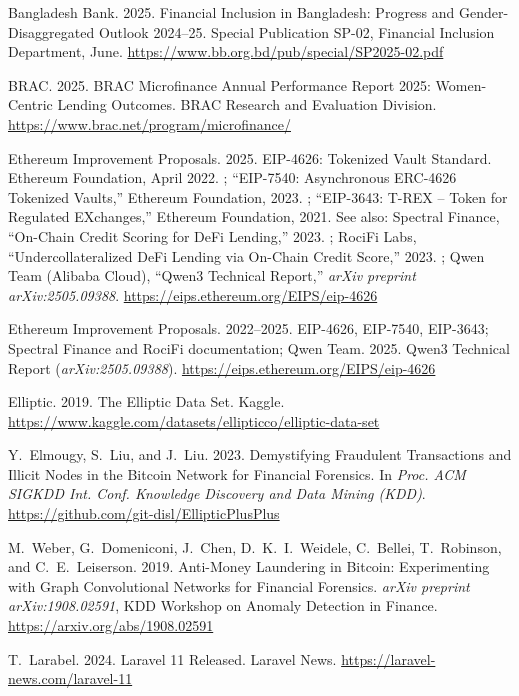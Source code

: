 \documentclass[12pt, a4paper]{report}
\begin{document}
{\begin{enumerate}[label={[\arabic*]}]
\item Bangladesh Bank. 2025. Financial Inclusion in Bangladesh: Progress and Gender-Disaggregated Outlook 2024--25. Special Publication SP-02, Financial Inclusion Department, June. \url{https://www.bb.org.bd/pub/special/SP2025-02.pdf}

\item BRAC. 2025. BRAC Microfinance Annual Performance Report 2025: Women-Centric Lending Outcomes. BRAC Research and Evaluation Division. \url{https://www.brac.net/program/microfinance/}

\item Ethereum Improvement Proposals. 2025. EIP-4626: Tokenized Vault Standard. Ethereum Foundation, April 2022. ; ``EIP-7540: Asynchronous ERC-4626 Tokenized Vaults,'' Ethereum Foundation, 2023. ; ``EIP-3643: T-REX -- Token for Regulated EXchanges,'' Ethereum Foundation, 2021.  See also: Spectral Finance, ``On-Chain Credit Scoring for DeFi Lending,'' 2023. ; RociFi Labs, ``Undercollateralized DeFi Lending via On-Chain Credit Score,'' 2023. ; Qwen Team (Alibaba Cloud), ``Qwen3 Technical Report,'' \emph{arXiv preprint arXiv:2505.09388}. \url{https://eips.ethereum.org/EIPS/eip-4626}

\item Ethereum Improvement Proposals. 2022--2025. EIP-4626, EIP-7540, EIP-3643; Spectral Finance and RociFi documentation; Qwen Team. 2025. Qwen3 Technical Report (\emph{arXiv:2505.09388}). \url{https://eips.ethereum.org/EIPS/eip-4626}

\item Elliptic. 2019. The Elliptic Data Set. Kaggle. \url{https://www.kaggle.com/datasets/ellipticco/elliptic-data-set}

\item Y.~Elmougy, S.~Liu, and J.~Liu. 2023. Demystifying Fraudulent Transactions and Illicit Nodes in the Bitcoin Network for Financial Forensics. In \emph{Proc. ACM SIGKDD Int. Conf. Knowledge Discovery and Data Mining (KDD)}. \url{https://github.com/git-disl/EllipticPlusPlus}

\item M.~Weber, G.~Domeniconi, J.~Chen, D.~K.~I.~Weidele, C.~Bellei, T.~Robinson, and C.~E.~Leiserson. 2019. Anti-Money Laundering in Bitcoin: Experimenting with Graph Convolutional Networks for Financial Forensics. \emph{arXiv preprint arXiv:1908.02591}, KDD Workshop on Anomaly Detection in Finance. \url{https://arxiv.org/abs/1908.02591}

\item T.~Larabel. 2024. Laravel 11 Released. Laravel News. \url{https://laravel-news.com/laravel-11}


\end{enumerate}}
\end{document}
